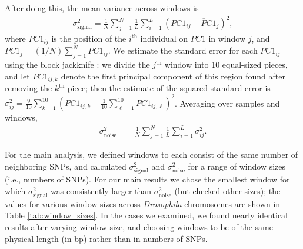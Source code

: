 \documentclass[11pt, oneside]{article}   	%
\newcommand\citep{\cite}
\newcommand{\pcone}{PC1}
\begin{document}
After doing this, the mean variance across windows is
\begin{align*}
    \sigma_\text{signal}^2
    = 
    \frac{1}{N} \sum_{j=1}^{N}
        \frac{1}{L}\sum_{i=1}^{L}\left ( \pcone_{ij} -\overline\pcone_{j} \right )^{2} ,
\end{align*}
where $\pcone_{ij}$ is the position of the $i^\text{th}$ individual on $\pcone$ in window $j$,
and $\overline\pcone_j = (1/N) \sum_{j=1}^N \pcone_{ij}$.
We estimate the standard error for each $\pcone_{ij}$ using the block jackknife \citep{efron1982jackknife,busing1999deletem}:
we divide the $j^\text{th}$ window into 10 equal-sized pieces,
and let $\pcone_{ij,k}$ denote the first principal component of this region found after removing the $k^\text{th}$ piece;
then the estimate of the squared standard error is
$\sigma^2_{ij} = \frac{9}{10} \sum_{k=1}^{10} ( \pcone_{ij,k} - \frac{1}{10} \sum_{\ell=1}^{10} \pcone_{ij,\ell} )^2$.
Averaging over samples and windows,
\begin{align*}
    \sigma^2_\text{noise}
    &=
    \frac{1}{N} \sum_{j=1}^{N} \frac{1}{L}\sum_{i=1}^{L} \sigma^2_{ij} .
\end{align*}

For the main analysis, we defined windows to each consist of the same number of neighboring SNPs,
and calculated $\sigma^2_\text{signal}$ and $\sigma^2_\text{noise}$
for a range of window sizes (i.e., numbers of SNPs).
For our main results we
chose the smallest window for which $\sigma^2_\text{signal}$ was consistently larger than $\sigma^2_\text{noise}$ (but checked other sizes);
the values for various window sizes across \textit{Drosophila} chromosomes are shown in Table \ref{tab:window_sizes}.
In the cases we examined, we found nearly identical results after varying window size,
and choosing windows to be of the same physical length (in bp) rather than in numbers of SNPs.

\end{document}
